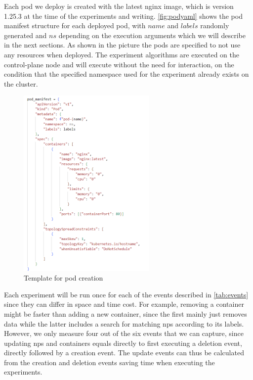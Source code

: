 Each pod we deploy is created with the latest nginx image, which is version 1.25.3 at the time of the experiments and writing. \autoref{fig:podyaml} shows the pod manifest structure for each deployed pod, with $name$ and $labels$ randomly generated and $ns$ depending on the execution arguments which we will describe in the next sections. As shown in the picture the pods are specified to not use any resources when deployed. The experiment algorithms are executed on the control-plane node and will execute without the need for interaction, on the condition that the specified namespace used for the experiment already exists on the cluster.
\\[10pt]
\begin{figure}[htbp]
  \centering
  \includegraphics[width=0.6\textwidth]{images/podyaml.png} 
  \caption{Template for pod creation}
  \label{fig:podyaml}
\end{figure}

Each experiment will be run once for each of the events described in \autoref{tab:events} since they can differ in space and time cost. For example, removing a container might be faster than adding a new container, since the first mainly just removes data while the latter includes a search for matching \acrshort{np}s according to its labels. However, we only measure four out of the six events that we can capture, since updating \acrshort{np}s and containers equals directly to first executing a deletion event, directly followed by a creation event. The update events can thus be calculated from the creation and deletion events saving time when executing the experiments.
\\[10pt]

